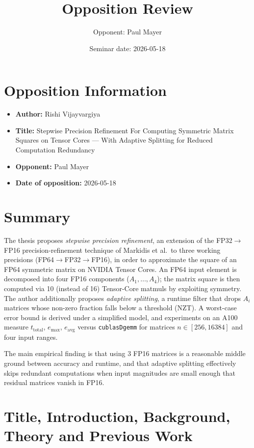 \documentclass[11pt,a4paper]{article}
\title{Opposition Review}
\author{Opponent: Paul Mayer}
\date{Seminar date: 2026-05-18}
\begin{document}
\maketitle

\section*{Opposition Information}
\begin{itemize}
  \item \textbf{Author:} Rishi Vijayvargiya
  \item \textbf{Title:} Stepwise Precision Refinement For Computing Symmetric Matrix Squares on Tensor Cores --- With Adaptive Splitting for Reduced Computation Redundancy
  \item \textbf{Opponent:} Paul Mayer
  \item \textbf{Date of opposition:} 2026-05-18
\end{itemize}

\section{Summary}

The thesis proposes \emph{stepwise precision refinement}, an extension of the FP32$\to$FP16 precision-refinement technique of Markidis et al.~to three working precisions (FP64$\to$FP32$\to$FP16), in order to approximate the square of an FP64 symmetric matrix on NVIDIA Tensor Cores. An FP64 input element is decomposed into four FP16 components ($A_1,\ldots,A_4$); the matrix square is then computed via 10 (instead of 16) Tensor-Core matmuls by exploiting symmetry. The author additionally proposes \emph{adaptive splitting}, a runtime filter that drops $A_i$ matrices whose non-zero fraction falls below a threshold (NZT). A worst-case error bound is derived under a simplified model, and experiments on an A100 measure $t_{\text{total}}$, $e_{\max}$, $e_{\text{avg}}$ versus \texttt{cublasDgemm} for matrices $n\in[256,16384]$ and four input ranges.

The main empirical finding is that using 3 FP16 matrices is a reasonable middle ground between accuracy and runtime, and that adaptive splitting effectively skips redundant computations when input magnitudes are small enough that residual matrices vanish in FP16.

\section{Title, Introduction, Background, Theory and Previous Work}
\end{document}
